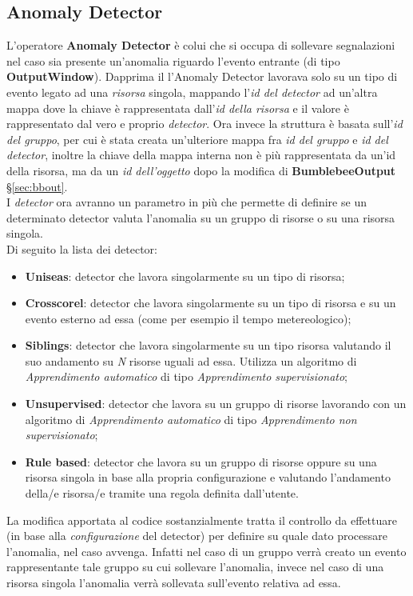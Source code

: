 \subsection{Anomaly Detector}
L'operatore \textbf{Anomaly Detector} è colui che si occupa di sollevare segnalazioni nel caso sia presente un'anomalia riguardo l'evento entrante (di tipo \textbf{OutputWindow}). Dapprima il l'Anomaly Detector lavorava solo su un tipo di evento legato ad una \textit{risorsa} singola, mappando l'\textit{id del detector} ad un'altra mappa dove la chiave è rappresentata dall'\textit{id della risorsa} e il valore è rappresentato dal vero e proprio \textit{detector}. Ora invece la struttura è basata sull'\textit{id del gruppo}, per cui è stata creata un'ulteriore mappa fra \textit{id del gruppo} e \textit{id del detector}, inoltre la chiave della mappa interna non è più rappresentata da un'id della risorsa, ma da un \textit{id dell'oggetto} dopo la modifica di \textbf{BumblebeeOutput} \S\ref{sec:bbout}.\\
I \textit{detector} ora avranno un parametro in più che permette di definire se un determinato detector valuta l'anomalia su un gruppo di risorse o su una risorsa singola.\\
Di seguito la lista dei detector:
\begin{itemize}
	\item{\textbf{Uniseas}: detector che lavora singolarmente su un tipo di risorsa;}
	\item{\textbf{Crosscorel}: detector che lavora singolarmente su un tipo di risorsa e su un evento esterno ad essa (come per esempio il tempo metereologico);}
	\item{\textbf{Siblings}: detector che lavora singolarmente su un tipo risorsa valutando il suo andamento su \textit{N} risorse uguali ad essa. Utilizza un algoritmo di \textit{\gls{Apprendimento automatico}} di tipo \textit{\gls{Apprendimento supervisionato}};}
	\item{\textbf{Unsupervised}: detector che lavora su un gruppo di risorse lavorando con un algoritmo di \textit{\gls{Apprendimento automatico}} di tipo \textit{\gls{Apprendimento non supervisionato}};}
	\item{\textbf{Rule based}: detector che lavora su un gruppo di risorse oppure su una risorsa singola in base alla propria configurazione e valutando l'andamento della/e risorsa/e tramite una regola definita dall'utente.}
\end{itemize}

La modifica apportata al codice sostanzialmente tratta il controllo da effettuare (in base alla \textit{configurazione} del detector) per definire su quale dato processare l'anomalia, nel caso avvenga. Infatti nel caso di un gruppo verrà creato un evento rappresentante tale gruppo su cui sollevare l'anomalia, invece nel caso di una risorsa singola l'anomalia verrà sollevata sull'evento relativa ad essa. 
